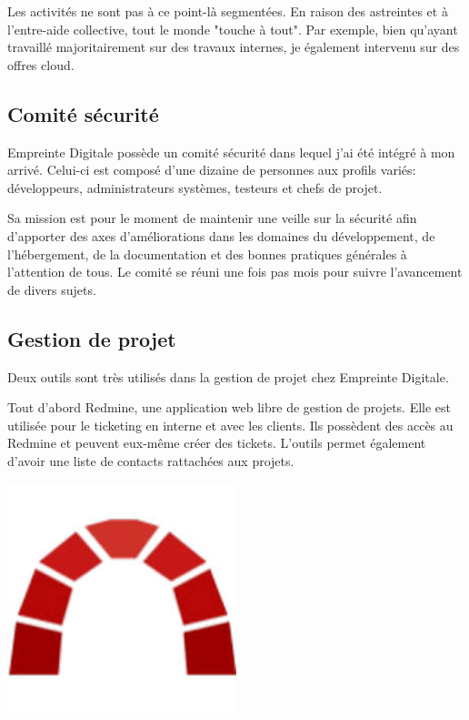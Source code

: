 \documentclass[12pt, a4paper, twoside]{article}
\begin{document}
Les activités ne sont pas à ce point-là segmentées. 
En raison des astreintes et à l'entre-aide collective, tout le monde "touche à tout". 
Par exemple, bien qu'ayant travaillé majoritairement sur des travaux internes, je également intervenu sur des offres cloud.

\subsection{Comité sécurité}
Empreinte Digitale possède un comité sécurité dans lequel j'ai été intégré à mon arrivé.
Celui-ci est composé d'une dizaine de personnes aux profils variés: développeurs, administrateurs systèmes, testeurs et chefs de projet.

Sa mission est pour le moment de maintenir une veille sur la sécurité afin d'apporter des axes d'améliorations dans les domaines du développement, de l'hébergement, de la documentation et des bonnes pratiques générales à l'attention de tous. 
Le comité se réuni une fois pas mois pour suivre l'avancement de divers sujets.

\subsection{Gestion de projet}
Deux outils sont très utilisés dans la gestion de projet chez Empreinte Digitale. \\

\noindent%
\begin{minipage}{.7\textwidth}%
Tout d'abord \gls{Redmine}, une application web libre de gestion de projets.
Elle est utilisée pour le ticketing en interne et avec les clients.
Ils possèdent des accès au \gls{Redmine} et peuvent eux-même créer des tickets.
L'outils permet également d'avoir une liste de contacts rattachées aux projets. \\
\end{minipage}%
\hfill
\begin{minipage}{.3\textwidth}%
\begin{center}
\includegraphics[width=0.5\textwidth]{src/logo_redmine.jpeg}
\end{center}
\end{minipage}%
\end{document}
